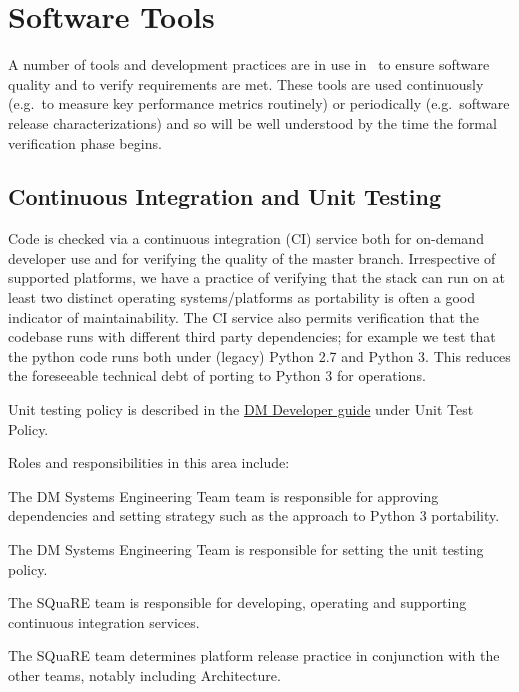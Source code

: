 \section{Software Tools}
\label{sect:tools}

A number of tools and development practices are in use in \product\ to ensure software quality and to verify requirements are met. These tools are used continuously (e.g.\ to measure key performance metrics routinely) or periodically (e.g.\ software release characterizations) and so will be well understood by the time the formal verification phase begins.

\subsection{Continuous Integration and Unit Testing}

Code is checked via a continuous integration (CI) service both for on-demand developer use and for verifying the quality of the master branch. Irrespective of supported platforms, we have a practice of verifying that the stack can run on at least two distinct operating systems/platforms as portability is often a good indicator of maintainability. The CI service also permits verification that the codebase runs with different third party dependencies; for example we test that the python code runs both under (legacy) Python 2.7 and Python 3. This reduces the foreseeable technical debt of porting to Python 3 for operations.

Unit testing policy is described in the \href{https://developer.lsst.io}{DM Developer guide} under Unit Test Policy.

Roles and responsibilities in this area include:

\begin{itemize_single}

\item The DM Systems Engineering Team team is responsible for approving dependencies and setting strategy such as the approach to Python 3 portability.

\item The DM Systems Engineering Team is responsible for setting the unit testing policy.

\item The SQuaRE team is responsible for developing, operating and supporting continuous integration services.

\item The SQuaRE team determines platform release practice in conjunction with the other teams, notably including Architecture.

\end{itemize_single}

